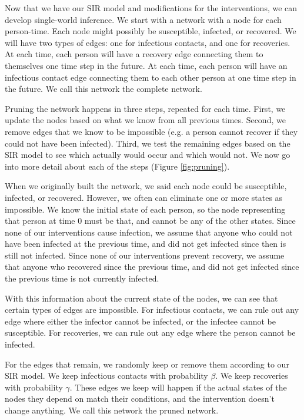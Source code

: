 \documentclass[openacc]{rsproca_new}%
\begin{document}
Now that we have our SIR model and modifications for the interventions, we can develop single-world inference.
We start with a network with a node for each person-time.
Each node might possibly be susceptible, infected, or recovered.
We will have two types of edges: one for infectious contacts, and one for recoveries.
At each time, each person will have a recovery edge connecting them to themselves one time step in the future.
At each time, each person will have an infectious contact edge connecting them to each other person at one time step in the future.
We call this network the complete network.

Pruning the network happens in three steps, repeated for each time.
First, we update the nodes based on what we know from all previous times.
Second, we remove edges that we know to be impossible (e.g. a person cannot recover if they could not have been infected).
Third, we test the remaining edges based on the SIR model to see which actually would occur and which would not.
We now go into more detail about each of the steps (Figure \ref{fig:pruning}).

When we originally built the network, we said each node could be susceptible, infected, or recovered.
However, we often can eliminate one or more states as impossible.
We know the initial state of each person, so the node representing that person at time $0$ must be that, and cannot be any of the other states.
Since none of our interventions cause infection, we assume that anyone who could not have been infected at the previous time, and did not get infected since then is still not infected.
Since none of our interventions prevent recovery, we assume that anyone who recovered since the previous time, and did not get infected since the previous time is not currently infected.

With this information about the current state of the nodes, we can see that certain types of edges are impossible.
For infectious contacts, we can rule out any edge where either the infector cannot be infected, or the infectee cannot be susceptible.
For recoveries, we can rule out any edge where the person cannot be infected.

For the edges that remain, we randomly keep or remove them according to our SIR model.
We keep infectious contacts with probability $\beta$.
We keep recoveries with probability $\gamma$.
These edges we keep will happen if the actual states of the nodes they depend on match their conditions, and the intervention doesn't change anything.
We call this network the pruned network.
\end{document}
